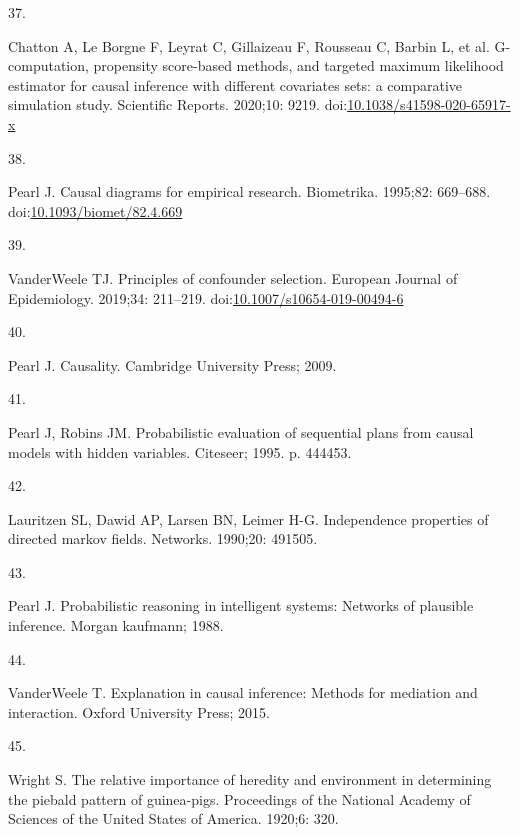 \documentclass[
  singlecolumn]{article}
\newlength{\cslhangindent}
\newlength{\csllabelwidth}
\newlength{\cslentryspacingunit} %
\newenvironment{CSLReferences}[2] %
 {%
  \setlength{\parindent}{0pt}
  \ifodd #1
  \let\oldpar\par
  \def\par{\hangindent=\cslhangindent\oldpar}
  \fi
  \setlength{\parskip}{#2\cslentryspacingunit}
 }%
 {}
\newcommand{\CSLLeftMargin}[1]{\parbox[t]{\csllabelwidth}{#1}}
\newcommand{\CSLRightInline}[1]{\parbox[t]{\linewidth - \csllabelwidth}{#1}\break}
\begin{document}
\begin{CSLReferences}{0}{0}
\leavevmode{}%
\CSLLeftMargin{37. }%
\CSLRightInline{Chatton A, Le Borgne F, Leyrat C, Gillaizeau F, Rousseau
C, Barbin L, et al. G-computation, propensity score-based methods, and
targeted maximum likelihood estimator for causal inference with
different covariates sets: a comparative simulation study. Scientific
Reports. 2020;10: 9219.
doi:\href{https://doi.org/10.1038/s41598-020-65917-x}{10.1038/s41598-020-65917-x}}

\leavevmode{}%
\CSLLeftMargin{38. }%
\CSLRightInline{Pearl J. Causal diagrams for empirical research.
Biometrika. 1995;82: 669--688.
doi:\href{https://doi.org/10.1093/biomet/82.4.669}{10.1093/biomet/82.4.669}}

\leavevmode{}%
\CSLLeftMargin{39. }%
\CSLRightInline{VanderWeele TJ. Principles of confounder selection.
European Journal of Epidemiology. 2019;34: 211--219.
doi:\href{https://doi.org/10.1007/s10654-019-00494-6}{10.1007/s10654-019-00494-6}}

\leavevmode{}%
\CSLLeftMargin{40. }%
\CSLRightInline{Pearl J. Causality. Cambridge University Press; 2009. }

\leavevmode{}%
\CSLLeftMargin{41. }%
\CSLRightInline{Pearl J, Robins JM. Probabilistic evaluation of
sequential plans from causal models with hidden variables. Citeseer;
1995. p. 444453. }

\leavevmode{}%
\CSLLeftMargin{42. }%
\CSLRightInline{Lauritzen SL, Dawid AP, Larsen BN, Leimer H-G.
Independence properties of directed markov fields. Networks. 1990;20:
491505. }

\leavevmode{}%
\CSLLeftMargin{43. }%
\CSLRightInline{Pearl J. Probabilistic reasoning in intelligent systems:
Networks of plausible inference. Morgan kaufmann; 1988. }

\leavevmode{}%
\CSLLeftMargin{44. }%
\CSLRightInline{VanderWeele T. Explanation in causal inference: Methods
for mediation and interaction. Oxford University Press; 2015. }

\leavevmode{}%
\CSLLeftMargin{45. }%
\CSLRightInline{Wright S. The relative importance of heredity and
environment in determining the piebald pattern of guinea-pigs.
Proceedings of the National Academy of Sciences of the United States of
America. 1920;6: 320. }


\end{CSLReferences}
\end{document}
